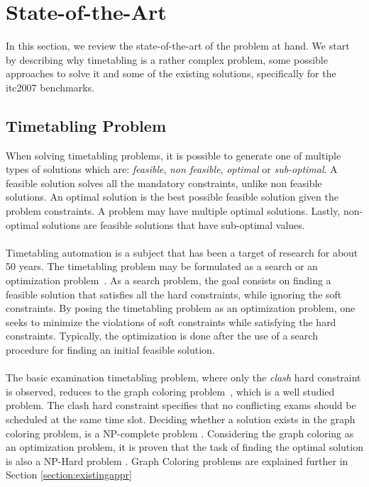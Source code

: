 \chapter{State-of-the-Art}
\label{stateofart}
\thispagestyle{plain}

In this section, we review the state-of-the-art of the problem at hand. We start by describing why timetabling is a rather complex problem, some possible approaches to solve it and some of the existing solutions, specifically for the \gls{itc2007} benchmarks.\\

\section{Timetabling Problem}

When solving timetabling problems, it is possible to generate one of multiple types of solutions which are: \textit{feasible}, \textit{non feasible}, \textit{optimal} or \textit{sub-optimal}. A feasible solution solves all the mandatory constraints, unlike non feasible solutions. An optimal solution is the best possible feasible solution given the problem constraints. A problem may have multiple optimal solutions. Lastly, non-optimal solutions are feasible solutions that have sub-optimal values.\\
\\
Timetabling automation is a subject that has been a target of research for about 50 years. The timetabling problem may be formulated as a search or an optimization problem~\cite{Schaerf1999}. As a search problem, the goal consists on finding a feasible solution that satisfies all the hard constraints, while ignoring the soft constraints. By posing the timetabling problem as an optimization problem, one seeks to minimize the violations of soft constraints while satisfying the hard constraints. Typically, the optimization is done after the use of a search procedure for finding an initial feasible solution.\\
\\
The basic examination timetabling problem, where only the \textit{clash} hard constraint is observed, reduces to the graph coloring problem~\cite{Jensen2001}, which is a well studied problem. The clash hard constraint specifies that no conflicting exams should be scheduled at the same time slot. Deciding whether a solution exists in the graph coloring problem, is a NP-complete \cite{Arora2009} problem \cite{Qu2009}. Considering the graph coloring as an optimization problem, it is proven that the task of finding the optimal solution is also a NP-Hard \cite{Arora2009} problem \cite{Qu2009}. Graph Coloring problems are explained further in Section \ref{section:existingappr}
\\
